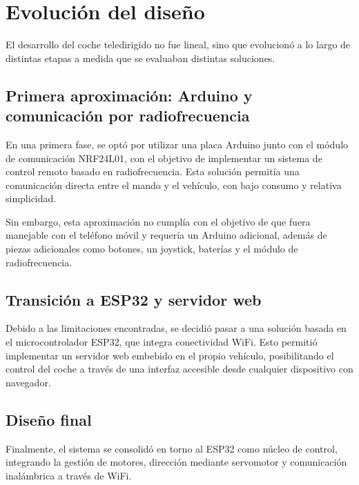 \section{Evolución del diseño}

El desarrollo del coche teledirigido no fue lineal, 
sino que evolucionó a lo largo de distintas etapas a 
medida que se evaluaban distintas soluciones.


\subsection{Primera aproximación: Arduino y comunicación por radiofrecuencia}

En una primera fase, se optó por utilizar una placa Arduino 
junto con el módulo de comunicación NRF24L01, con el objetivo de 
implementar un sistema de control remoto basado en radiofrecuencia. 
Esta solución permitía una comunicación directa entre el mando y 
el vehículo, con bajo consumo y relativa simplicidad.

Sin embargo, esta aproximación no cumplía con el objetivo de que 
fuera manejable con el teléfono móvil y requería un Arduino
adicional, además de piezas adicionales como botones, un 
joystick, baterías y el módulo de radiofrecuencia.

\subsection{Transición a ESP32 y servidor web}

Debido a las limitaciones encontradas, se decidió pasar a una 
solución basada en el microcontrolador ESP32, que integra conectividad 
WiFi. Esto permitió implementar un servidor web embebido en el 
propio vehículo, posibilitando el control del coche a través de una 
interfaz accesible desde cualquier dispositivo con navegador.

\subsection{Diseño final}

Finalmente, el sistema se consolidó en torno al ESP32 como núcleo de 
control, integrando la gestión de motores, dirección mediante servomotor 
y comunicación inalámbrica a través de WiFi.
